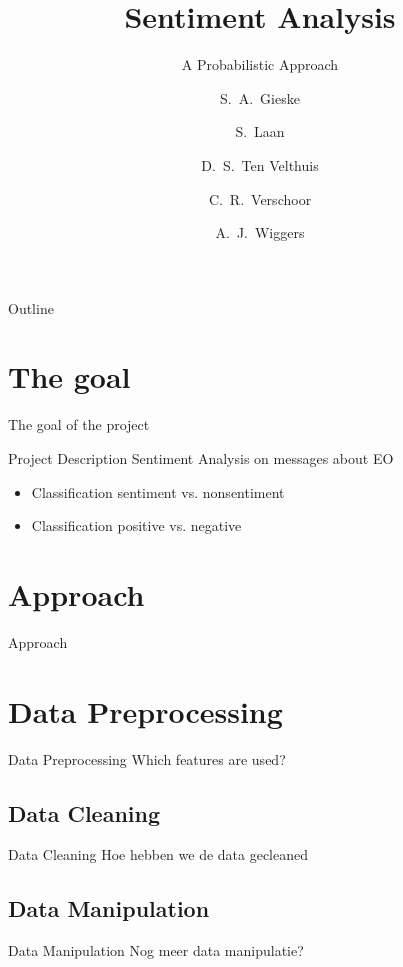 \documentclass{beamer}
\title[Leren en Beslissen - Sentiment Analisys]
{Sentiment Analysis}
\subtitle{A Probabilistic Approach}
\author[Gieske, Laan, Verschoor, ten Velthuis, Wiggers ] %
{S.~A.~Gieske \and S.~Laan \and D.~S.~Ten Velthuis \and C.~R.~Verschoor \and A.~J.~Wiggers}
\institute[University of Amsterdam] %
{
  Faculty of Science (FNWI) \\
  University of Amsterdam
  }
\begin{document}
\begin{frame}
  \titlepage
\end{frame}

\begin{frame}{Outline}
  \setcounter{tocdepth}{1}
  \tableofcontents
\end{frame}


\section{The goal}

\begin{frame}{The goal of the project}
\begin{block}{Project Description}
Sentiment Analysis on messages about EO
\end{block}
\begin{itemize}
\item Classification sentiment vs. nonsentiment
\item Classification positive vs. negative
\end{itemize}
\end{frame}

\section{Approach}
\begin{frame}{Approach}
\end{frame}

\section{Data Preprocessing}
\begin{frame}{Data Preprocessing}
Which features are used?
\end{frame}
\subsection{Data Cleaning}
\begin{frame}{Data Cleaning}
Hoe hebben we de data gecleaned
\end{frame}
\subsection{Data Manipulation}
\begin{frame}{Data Manipulation}
Nog meer data manipulatie?
\end{frame}
\end{document}
